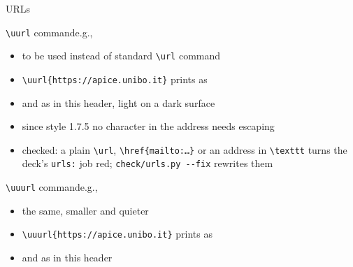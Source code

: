 \begin{frame}[c,fragile]{URLs}
%
\begin{block}{\texttt{\textbackslash{}uurl} command\textemdash{}e.g., }
\begin{itemize}
	\item to be used instead of standard \texttt{\textbackslash{}url} command
	\item[e.g.] \verb|| prints as \uurl{https://apice.unibo.it}
	\item[] and as in this header, light on a dark surface
	\item since style 1.7.5 no character in the address needs escaping
	\item checked: a plain \texttt{\textbackslash{}url}, \texttt{\textbackslash{}href\{mailto:\ldots\}} or an address in \texttt{\textbackslash{}texttt} turns the deck's \texttt{urls:} job red; \texttt{check/urls.py -{}-fix} rewrites them
\end{itemize}
\end{block}
%
\begin{block}{\texttt{\textbackslash{}uuurl} command\textemdash{}e.g., }
\begin{itemize}
	\item the same, smaller and quieter
	\item[e.g.] \verb|| prints as \uuurl{https://apice.unibo.it}
	\item[] and as in this header
\end{itemize}
\end{block}
%
\end{frame}
